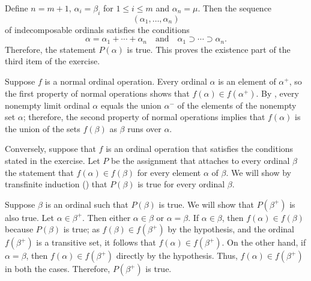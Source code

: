 \documentclass{article}
\begin{document}
\begin{solution}[\ref{exe:fdb94svq}]
  Define \(n = m+1\), \(\alpha_i = \beta_i\) for \(1 \leq i \leq m\)
  and \(\alpha_n = \mu\).  Then the sequence
  \begin{displaymath}
    (\alpha_1, \dotsc, \alpha_n)
  \end{displaymath}
  of indecomposable ordinals satisfies the conditions
  \begin{displaymath}
    \alpha = \alpha_1 + \dotsb + \alpha_n
    \quad \text{and} \quad
    \alpha_1 \supset \dotsb \supset \alpha_n.
  \end{displaymath}
  Therefore, the statement \(P(\alpha)\) is true.  This proves the
  existence part of the third item of the exercise.
\end{solution}

\begin{solution}[\ref{exe:1npoplek}]
  \label{sol:1m0wukaa}
  Suppose \(f\) is a normal ordinal operation.  Every ordinal
  \(\alpha\) is an element of \(\alpha^+\), so the first property of
  normal operations shows that \(f(\alpha) \in f(\alpha^+)\).  By
  , every nonempty limit ordinal \(\alpha\) equals
  the union \(\alpha^-\) of the elements of the nonempty set
  \(\alpha\); therefore, the second property of normal operations
  implies that \(f(\alpha)\) is the union of the sets \(f(\beta)\) as
  \(\beta\) runs over \(\alpha\).

  Conversely, suppose that \(f\) is an ordinal operation that
  satisfies the conditions stated in the exercise.  Let \(P\) be the
  assignment that attaches to every ordinal \(\beta\) the statement
  that \(f(\alpha) \in f(\beta)\) for every element \(\alpha\) of
  \(\beta\).  We will show by transfinite induction
  () that \(P(\beta)\) is true for every ordinal
  \(\beta\).

  Suppose \(\beta\) is an ordinal such that \(P(\beta)\) is true.  We
  will show that \(P(\beta^+)\) is also true.  Let
  \(\alpha \in \beta^+\).  Then either \(\alpha \in \beta\) or
  \(\alpha = \beta\).  If \(\alpha \in \beta\), then
  \(f(\alpha) \in f(\beta)\) because \(P(\beta)\) is true; as
  \(f(\beta) \in f(\beta^+)\) by the hypothesis, and the ordinal
  \(f(\beta^+)\) is a transitive set, it follows that
  \(f(\alpha) \in f(\beta^+)\).  On the other hand, if
  \(\alpha = \beta\), then \(f(\alpha) \in f(\beta^+)\) directly by
  the hypothesis.  Thus, \(f(\alpha) \in f(\beta^+)\) in both the
  cases.  Therefore, \(P(\beta^+)\) is true.


\end{solution}
\end{document}
